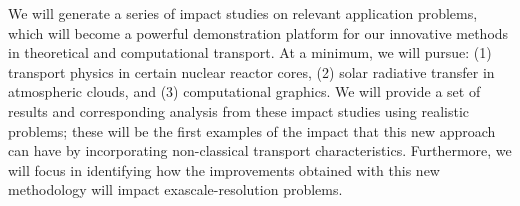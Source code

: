 \documentclass[12pt]{article}
\begin{document}
We will generate a series of impact studies on relevant application problems, which will become a powerful demonstration platform for our innovative methods in theoretical and computational transport.
At a minimum, we will pursue: (1) transport physics in certain nuclear reactor cores, (2) solar radiative transfer in atmospheric clouds, and (3) computational
graphics.
We will provide a set of results and corresponding analysis from these impact studies using realistic problems; these will be the first examples of the impact that this new approach can have by incorporating non-classical transport characteristics.
Furthermore, we will focus in identifying how the improvements obtained with this new methodology will impact exascale-resolution problems.
\end{document}
